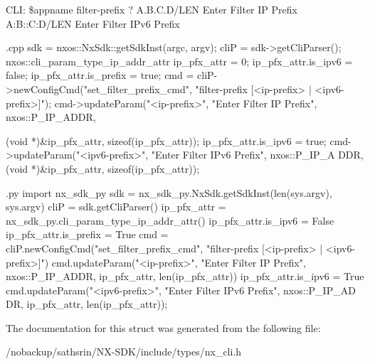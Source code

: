 CLI: \$appname filter-\/prefix ? A.B.C.D/LEN Enter Filter IP Prefix A:B::C:D/LEN Enter Filter IPv6 Prefix


\begin{DoxyCode}
 {.cpp}
       sdk = nxos::NxSdk::getSdkInst(argc, argv);
       cliP = sdk->getCliParser();
       nxos::cli_param_type_ip_addr_attr ip_pfx_attr = {0};
       ip_pfx_attr.is_ipv6 = false;
       ip_pfx_attr.is_prefix = true;
       cmd = cliP->newConfigCmd("set_filter_prefix_cmd",
                                "filter-prefix [<ip-prefix> | <ipv6-prefix>]");
       cmd->updateParam("<ip-prefix>", "Enter Filter IP Prefix", nxos::P_IP_ADDR,
      
                        (void *)&ip_pfx_attr, sizeof(ip_pfx_attr));
       ip_pfx_attr.is_ipv6 = true;
       cmd->updateParam("<ipv6-prefix>", "Enter Filter IPv6 Prefix", nxos::P_IP_A
      DDR,
                        (void *)&ip_pfx_attr, sizeof(ip_pfx_attr));
\end{DoxyCode}



\begin{DoxyCode}
 {.py}
       import nx_sdk_py
       sdk = nx_sdk_py.NxSdk.getSdkInst(len(sys.argv), sys.argv)
       cliP = sdk.getCliParser()
       ip_pfx_attr = nx_sdk_py.cli_param_type_ip_addr_attr()
       ip_pfx_attr.is_ipv6 = False
       ip_pfx_attr.is_prefix = True
       cmd = cliP.newConfigCmd("set_filter_prefix_cmd",
                               "filter-prefix [<ip-prefix> | <ipv6-prefix>]")
       cmd.updateParam("<ip-prefix>", "Enter Filter IP Prefix", nxos::P_IP_ADDR,
                       ip_pfx_attr, len(ip_pfx_attr))
       ip_pfx_attr.is_ipv6 = True
       cmd.updateParam("<ipv6-prefix>", "Enter Filter IPv6 Prefix", nxos::P_IP_AD
      DR,
                       ip_pfx_attr, len(ip_pfx_attr));
\end{DoxyCode}
 

The documentation for this struct was generated from the following file:\begin{DoxyCompactItemize}
\item 
/nobackup/sathsrin/NX-\/SDK/include/types/nx\_\-cli.h\end{DoxyCompactItemize}

